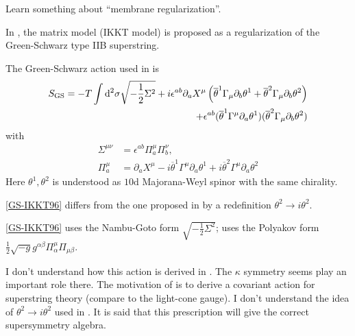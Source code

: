 
\begin{todo}
	Learn something about ``membrane regularization''.
\end{todo}



In ,
the matrix model (IKKT model) is proposed as a regularization of
the Green-Schwarz type IIB superstring.

The Green-Schwarz action  used in  is
\begin{align}\label{GS-IKKT96}
	S_{\text{GS}} = -T \int \mathrm{d}^2\sigma
	\sqrt{-\frac{1}{2}\Sigma^2}
	+ i \epsilon^{ab} \partial_a X^\mu
	\left( \overline{\theta}^1 \Gamma_\mu \partial_b \theta^1 
	+ \overline{\theta}^2 \Gamma_{\mu} \partial_b \theta^2\right) \notag\\
	+ \epsilon^{ab} (\overline{\theta}^1 \Gamma^\mu \partial_a \theta^1)
	(\overline{\theta}^2\Gamma_\mu\partial_b\theta^2)
\end{align}
with
\begin{align*}
	\Sigma^{\mu\nu} &= \epsilon^{ab} \Pi^\mu_a \Pi^\nu_b,\\
	\Pi^\mu_a &= \partial_a X^\mu - i \overline{\theta}^1 \Gamma^\mu \partial_a \theta^1 + i \overline{\theta}^2 \Gamma^\mu \partial_a \theta^2
\end{align*}
Here $\theta^1,\theta^2$ is understood as $10 \mathrm{d}$
Majorana-Weyl spinor with the same chirality.


\eqref{GS-IKKT96} differs from the one proposed in 
by a redefinition $\theta^2\to i\theta^2$.

\eqref{GS-IKKT96} uses the Nambu-Goto form $\sqrt{-\frac{1}{2}\Sigma^2}$;
 uses the Polyakov form $\frac{1}{2}\sqrt{-g}g^{\alpha\beta}
\Pi^\mu_{\alpha}\Pi_{\mu\beta}$.

\begin{question}
	I don't understand how this action is derived in .
	The $\kappa$ symmetry seems play an important role there.
	The motivation of  is to derive a covariant action
	for superstring theory (compare to the light-cone gauge).
	I don't understand the idea of $\theta^2\to i\theta^2$
	used in .
	It is said that this prescription will give the correct supersymmetry
	algebra.
\end{question}

